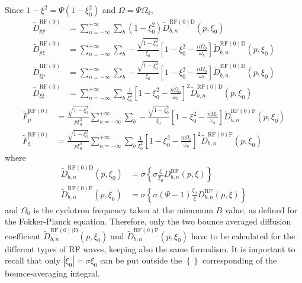 Since $1-\xi^{2}=\Psi\left(  1-\xi_{0}^{2}\right)  $ and $\Omega=\Psi
\Omega_{0}$,
\begin{align}
\widetilde{D}_{pp}^{\text{RF}(0)}  &  =\sum_{n=-\infty}^{+\infty}\sum
_{b}(1-\xi_{0}^{2})\widetilde{D}_{b,n}^{\text{RF}(0)\text{D}}(p,\xi_{0})\\
\widetilde{D}_{p\xi}^{\text{RF}(0)}  &  =\sum_{n=-\infty}^{+\infty}\sum
_{b}-\frac{\sqrt{1-\xi_{0}^{2}}}{\xi_{0}}\left[  1-\xi_{0}^{2}-\frac
{n\Omega_{0}}{\omega_{b}}\right]  \widetilde{D}_{b,n}^{\text{RF}(0)\text{D}%
}(p,\xi_{0})\\
\widetilde{D}_{\xi p}^{\text{RF}(0)}  &  =\sum_{n=-\infty}^{+\infty}\sum
_{b}-\frac{\sqrt{1-\xi_{0}^{2}}}{\xi_{0}}\left[  1-\xi_{0}^{2}-\frac
{n\Omega_{0}}{\omega_{b}}\right]  \widetilde{D}_{b,n}^{\text{RF}(0)\text{D}%
}(p,\xi_{0})\\
\widetilde{D}_{\xi\xi}^{\text{RF}(0)}  &  =\sum_{n=-\infty}^{+\infty}\sum
_{b}\frac{1}{\xi_{0}^{2}}\left[  1-\xi_{0}^{2}-\frac{n\Omega_{0}}{\omega_{b}%
}\right]  ^{2}\widetilde{D}_{b,n}^{\text{RF}(0)\text{D}}(p,\xi_{0})
\end{align}%
\begin{align}
\widetilde{F}_{p}^{\text{RF}(0)}  &  =\frac{\sqrt{1-\xi_{0}^{2}}}{p\xi_{0}%
^{3}}\sum_{n=-\infty}^{+\infty}\sum_{b}-\frac{\sqrt{1-\xi_{0}^{2}}}{\xi_{0}%
}\left[  1-\xi_{0}^{2}-\frac{n\Omega_{0}}{\omega_{b}}\right]  \widetilde
{D}_{b,n}^{\text{RF}(0)\text{F}}(p,\xi_{0})\\
\widetilde{F}_{\xi}^{\text{RF}(0)}  &  =\frac{\sqrt{1-\xi_{0}^{2}}}{p\xi
_{0}^{3}}\sum_{n=-\infty}^{+\infty}\sum_{b}\frac{1}{\xi_{0}^{2}}\left[
1-\xi_{0}^{2}-\frac{n\Omega_{0}}{\omega_{b}}\right]  ^{2}\widetilde{D}%
_{b,n}^{\text{RF}(0)\text{F}}(p,\xi_{0})\nonumber
\end{align}
where
\begin{align}
\widetilde{D}_{b,n}^{\text{RF}(0)\text{D}}(p,\xi_{0})  &  =\sigma\left\{
\sigma\frac{\xi}{\xi_{0}}D_{b,n}^{\text{RF}}(p,\xi)\right\}
\label{bouncedrf_dke}\\
\widetilde{D}_{b,n}^{\text{RF}(0)\text{F}}(p,\xi_{0})  &  =\sigma\left\{
\sigma\left(  \Psi-1\right)  \frac{\xi_{0}}{\xi}D_{b,n}^{\text{RF}}%
(p,\xi)\right\} \nonumber
\end{align}
and $\Omega_{0}$ is the cyclotron frequency taken at the minumum $B$ value, as
defined for the Fokker-Planck equation. Therefore, only the two bounce
averaged diffusion coefficient $\widetilde{D}_{b,n}^{\text{RF}(0))\text{D}%
}(p,\xi_{0})$ and $\widetilde{D}_{b,n}^{\text{RF}(0)\text{F}}(p,\xi_{0})$ have
to be calculated for the different types of RF waves, keeping also the same
formalism. It is important to recall that only $\left|  \xi_{0}\right|
=\sigma\xi_{0}$ can be put outside the $\left\{  {}\right\}  $ corresponding
of the bounce-averaging integral.

